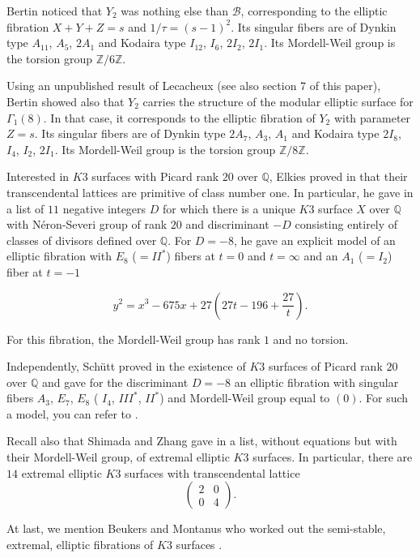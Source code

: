 \documentclass{amsart}
\begin{document}
Bertin noticed that $Y_2$ was nothing else than $\mathcal B$, corresponding to the elliptic fibration $X+Y+Z=s$ and $1/\tau =(s-1)^2$. Its singular fibers are of Dynkin type $A_{11}$, $A_5$, $2A_1$ and Kodaira type $I_{12}$, $I_6$, $2I_2$, $2I_1$. Its Mordell-Weil group is the torsion group $\mathbb Z /6 \mathbb Z$.

Using an unpublished result of Lecacheux (see also section 7 of this paper), Bertin showed also that $Y_2$ carries the structure of the modular elliptic surface for $\Gamma_1(8)$. In that case, it corresponds to the elliptic fibration of $Y_2$ with parameter $Z=s$. Its singular fibers are of Dynkin type $2A_7$, $A_3$, $A_1$ and Kodaira type $2I_8$, $I_4$, $I_2$, $2I_1$. Its Mordell-Weil group is the torsion group $\mathbb Z/8 \mathbb Z$.

Interested in $K3$ surfaces with Picard rank $20$ over $\mathbb Q$, Elkies proved in \cite{El1} that their transcendental lattices are primitive of class number one. In particular, he gave in \cite{El2} a list of $11$ negative integers $D$ for which there is a unique $K3$ surface $X$ over $\mathbb Q$ with N\'eron-Severi group of rank $20$ and discriminant $-D$ consisting entirely of classes of divisors defined over $\mathbb Q$.
For $D=-8$, he gave an explicit model of an elliptic fibration with $E_8$ ($=II^*$) fibers at $t=0$ and $t=\infty$ and an $A_1$ ($=I_2$) fiber at $t=-1$

$$y^2=x^3-675x+27(27t-196+\frac {27}{t}).$$

For this fibration, the Mordell-Weil group has rank $1$ and no torsion.

Independently, Sch\"{u}tt proved in \cite{Sch} the existence of $K3$ surfaces of Picard rank $20$ over $\mathbb Q$ and gave for the discriminant $D=-8$ an elliptic fibration with singular fibers $A_3$, $E_7$, $E_8$ ( $I_4$, $III^*$, $II^*$) and Mordell-Weil group equal to $(0)$.
For such a model, you can refer to \cite{Sch1}.

Recall also that Shimada and Zhang gave in \cite{Shim} a list, without equations but with their Mordell-Weil group, of extremal elliptic $K3$ surfaces. In particular, there are $14$ extremal elliptic $K3$ surfaces with transcendental lattice
$$
\left (
\begin{matrix}
2  &   0 \\
0  &   4
\end{matrix}
\right ).
$$

At last, we mention Beukers and Montanus who worked out the semi-stable, extremal, elliptic fibrations of $K3$ surfaces \cite{BM}.
\end{document}
